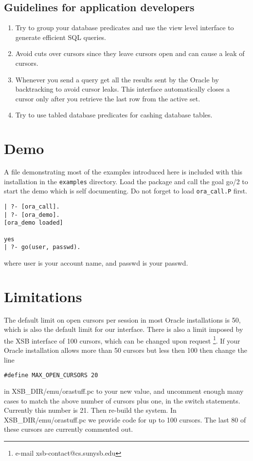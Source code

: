 \subsection{Guidelines for application developers} \label{Guide}
\begin{enumerate}
\item  Try to group your database predicates and use the view level interface
   to generate efficient SQL queries.
\item  Avoid cuts over cursors since they leave cursors open and can cause
   a leak of cursors.
\item Whenever you send a query get all the results sent by the Oracle by
   backtracking to avoid cursor leaks.  This interface automatically closes a 
   cursor only after you retrieve the last row from the active set.
\item Try to use tabled database predicates for cashing database tables.
\end{enumerate}



\section{Demo}
A file demonstrating most of the examples introduced here is included
with this installation in the {\tt examples} directory.  Load the
package and call the goal go/2 to start the demo which is self
documenting.  Do not forget to load {\tt ora\_call.P} first.

\begin{verbatim}
| ?- [ora_call].
| ?- [ora_demo].
[ora_demo loaded]

yes
| ?- go(user, passwd).
\end{verbatim}
where user is your account name, and passwd is your passwd.


\section{Limitations}
The default limit on open cursors per session in most Oracle
installations is 50, which is also the default limit for our
interface.  There is also a limit imposed by the XSB interface of 100
cursors, which can be changed upon request
\footnote{e-mail xsb-contact@cs.sunysb.edu}.
If your Oracle installation allows more than 50 cursors but
less then 100 then change the line 
\begin{verbatim} 
#define MAX_OPEN_CURSORS 20 
\end{verbatim} 
in XSB\_DIR/emu/orastuff.pc to your new value, and uncomment enough
many cases to match the above number of cursors plus one, in the switch
statements. Currently this number is 21. Then re-build the system. In 
XSB\_DIR/emu/orastuff.pc we provide code for up to 100 cursors. The last
80 of these cursors are currently commented out.



